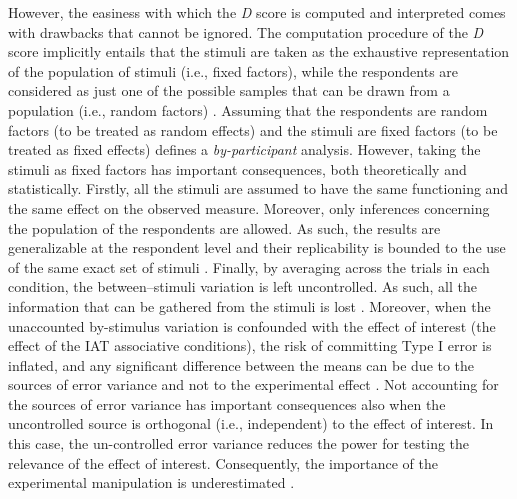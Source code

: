 \documentclass[12pt]{book}
\begin{document}
However, the easiness with which the \emph{D} score is computed and interpreted comes with drawbacks that cannot be ignored. 
The computation procedure of the \emph{D} score implicitly entails that the stimuli are taken as the exhaustive representation of the population of stimuli (i.e., fixed factors), while the respondents are considered as just one of the possible samples that can be drawn from a population (i.e., random factors) \cite{judd2012}. 
Assuming that the respondents are random factors (to be treated as random effects) and the stimuli are fixed factors (to be treated as fixed effects) defines a \emph{by-participant} analysis. 
However, taking the stimuli as fixed factors has important consequences, both theoretically and statistically. 
Firstly,  all the stimuli are assumed to have the same functioning and the same effect on the observed measure.
Moreover, only inferences concerning the population of the respondents are allowed. As such, the results are generalizable at the respondent level and their replicability  is bounded to the use of the same exact set of stimuli \cite{judd2012}. 
Finally, by averaging across the trials in each condition, the between--stimuli variation is left uncontrolled. As such, all the information that can be gathered from the stimuli is lost \cite{wols2017}.  
Moreover, when the unaccounted by-stimulus variation is confounded with the effect of interest (the effect of the IAT associative conditions), the risk of committing Type I error is inflated, and any significant difference between the means can be due to the sources of error variance and not to the experimental effect \cite{Barr2013, judd2012,mc1989}. 
Not accounting for the sources of error variance has important consequences also when the uncontrolled source is orthogonal (i.e., independent) to the effect of interest. In this case, the un-controlled error variance reduces the power for testing the relevance of the effect of interest. Consequently, the importance of the experimental manipulation is underestimated \cite{Barr2013}. 
\end{document}
